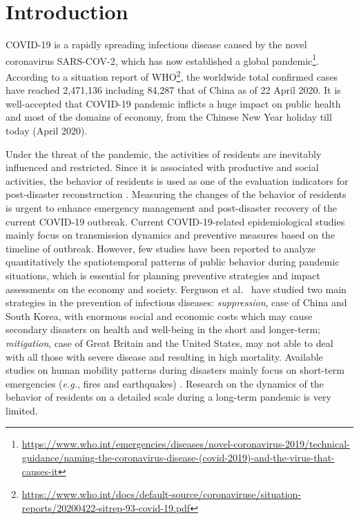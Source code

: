 \documentclass[ijgi,submit,moreauthors,pdftex]{Definitions/mdpi}
\begin{document}
\section{Introduction}
COVID-19 is a rapidly spreading infectious disease caused by the novel coronavirus SARS-COV-2, which has now established a global pandemic\footnote{\url{https://www.who.int/emergencies/diseases/novel-coronavirus-2019/technical-guidance/naming-the-coronavirus-disease-(covid-2019)-and-the-virus-that-causes-it}}.
According to a situation report of WHO\footnote{\url{https://www.who.int/docs/default-source/coronaviruse/situation-reports/20200422-sitrep-93-covid-19.pdf}}, the worldwide total confirmed cases have reached 2,471,136 including 84,287 that of China as of 22 April 2020.
It is well-accepted that COVID-19 pandemic inflicts a huge impact on public health and most of the domains of economy, from the Chinese New Year holiday till today (April 2020).

Under the threat of the pandemic, the activities of residents are inevitably influenced and restricted.
Since it is associated with productive and social activities, the behavior of residents is used as one of the evaluation indicators for post-disaster reconstruction \cite{Wang2016Research, Akter2019Big}.
Measuring the changes of the behavior of residents is urgent to enhance emergency management and post-disaster recovery of the current COVID-19 outbreak.
Current COVID-19-related epidemiological studies mainly focus on transmission dynamics \cite{li2020early,pitzer2009demographic} and preventive measures \cite{chinazzi2020effect,van2006today} based on the timeline of outbreak.
However, few studies have been reported to analyze quantitatively the spatiotemporal patterns of public behavior during pandemic situations, which is essential for planning preventive strategies and impact assessments on the economy and society.
Ferguson et al.\ \cite{ferguson2020report} have studied two main strategies in the prevention of infectious diseases: \textit{suppression}, case of China and South Korea, with enormous social and economic costs which may cause secondary disasters on health and well-being in the short and longer-term;
\textit{mitigation}, case of Great Britain and the United States, may not able to deal with all those with severe disease and resulting in high mortality.
Available studies on human mobility patterns during disasters mainly focus on short-term emergencies (\textit{e.g.}, fires and earthquakes) \cite{Song2010Modelling,Song2014Prediction}.
Research on the dynamics of the behavior of residents on a detailed scale during a long-term pandemic is very limited.
\end{document}
